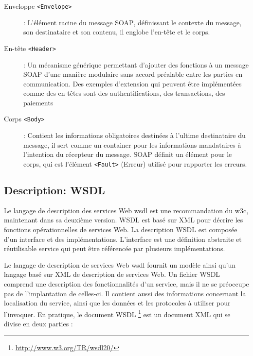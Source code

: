   \SpecialItem
  \begin{description}
  \item[Enveloppe \texttt{<Envelope>}]: L'élément racine du message
    \textsc{SOAP}, définissant le contexte du message, son
    destinataire et son contenu, il englobe l'en-tête et le corps.

  \item[En-tête \texttt{<Header>}]: Un mécanisme générique permettant
    d'ajouter des fonctions à un message \textsc{SOAP} d'une manière
    modulaire sans accord préalable entre les parties en
    communication.  Des exemples d'extension qui peuvent être
    implémentées comme des en-têtes sont des authentifications, des
    transactions, des paiements

  \item[Corps \texttt{<Body>}]: Contient les informations obligatoires
    destinées à l'ultime destinataire du message, il sert comme un
    container pour les informations mandataires à l'intention du
    récepteur du message. \textsc{SOAP} définit un élément pour le
    corps, qui est l'élément \texttt{<Fault>} (Erreur) utilisé pour
    rapporter les erreurs.
  \end{description}

  \subsection{Description: WSDL}
  \label{sec:wsdl}
  Le langage de description des services Web \acrshort{wsdl}
  \cite{christensen2001web, chinnici2007web} est une recommandation du
  \acrshort{w3c}, maintenant dans sa deuxième version.  \textsc{WSDL}
  est basé sur \textsc{XML} pour décrire les fonctions opérationnelles
  de services Web. La description \textsc{WSDL} est composée d'un
  interface et des implémentations. L'interface est une définition
  abstraite et réutilisable service qui peut être référencée par
  plusieurs implémentations.

  

  Le langage de description de services Web \acrshort{wsdl}
  \cite{chinnici2007web} fournit un modèle ainsi qu'un langage basé
  sur \textsc{XML} de description de services Web. Un fichier
  \textsc{WSDL} comprend une description des fonctionnalités d'un
  service, mais il ne se préoccupe pas de l'implantation de celles-ci.
  Il contient aussi des informations concernant la localisation du
  service, ainsi que les données et les protocoles à utiliser pour
  l'invoquer. En pratique, le document \textsc{WSDL}
  \footnote{\url{http://www.w3.org/TR/wsdl20/}} est un document
  \textsc{XML} qui se divise en deux parties \cite{elie2010} :

